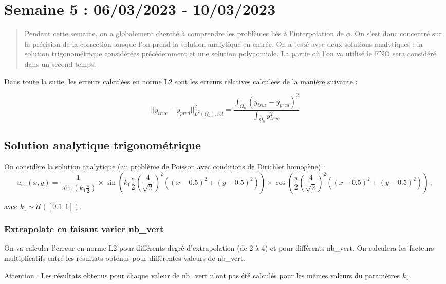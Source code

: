 \section{Semaine 5 : 06/03/2023 - 10/03/2023}
\graphicspath{{semaines/semaine_5/images/}}

\begin{abstract}
	Pendant cette semaine, on a globalement cherché à comprendre les problèmes liés à l'interpolation de $\phi$. On s'est donc concentré sur la précision de la correction lorsque l'on prend la solution analytique en entrée. On a testé avec deux solutions analytiques : la solution trigonométrique considérées précédemment et une solution polynomiale. La partie où l'on va utilisé le FNO sera considéré dans un second temps.
\end{abstract}

Dans toute la suite, les erreurs calculées en norme L2 sont les erreurs relatives calculées de la manière suivante :

$$||y_{true}-y_{pred}||^2_{L^2(\Omega_h),rel}=\frac{\int_{\Omega_h}(y_{true}-y_{pred})^2}{\int_{\Omega_h}y_{true}^2}$$

\subsection{Solution analytique trigonométrique}

On considère la solution analytique (au problème de Poisson avec conditions de Dirichlet homogène) :
$$u_{ex}(x,y) = \frac{1}{\sin\left(k_1\frac{\pi}{2}\right)}\times\sin\left(k_1\frac{\pi}{2}\left(\frac{4}{\sqrt{2}}\right)^2\left((x-0.5)^2+(y-0.5)^2\right)\right)\times\cos\left(\frac{\pi}{2}\left(\frac{4}{\sqrt{2}}\right)^2\left((x-0.5)^2+(y-0.5)^2\right)\right)\,, $$ 

avec $k_1 \sim \mathcal{U}([0.1,1])$.

\subsubsection*{Extrapolate en faisant varier nb\_vert}

On va calculer l'erreur en norme L2 pour différents degré d'extrapolation (de 2 à 4) et pour différents nb\_vert. On calculera les facteurs multiplicatifs entre les résultats obtenus pour différentes valeurs  de nb\_vert.

Attention : Les résultats obtenus pour chaque valeur de nb\_vert n'ont pas été calculés pour les mêmes valeurs du paramètres $k_1$. 

